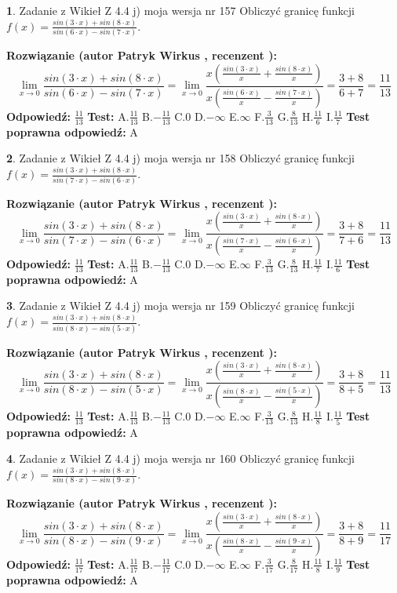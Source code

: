\documentclass[12pt, a4paper]{article}
\theoremstyle{definition} %
\newtheorem{zad}{}
\newcommand{\zadStart}[1]{\begin{zad}#1\newline}
\newcommand{\zadStop}{\end{zad}}
\newcommand{\rozwStart}[2]{\noindent \textbf{Rozwiązanie (autor #1 , recenzent #2): }\newline}
\newcommand{\rozwStop}{\newline}
\newcommand{\odpStart}{\noindent \textbf{Odpowiedź:}\newline}
\newcommand{\odpStop}{\newline}
\newcommand{\testStart}{\noindent \textbf{Test:}\newline}
\newcommand{\testStop}{\newline}
\newcommand{\kluczStart}{\noindent \textbf{Test poprawna odpowiedź:}\newline}
\newcommand{\kluczStop}{\newline}
\begin{document}
\zadStart{Zadanie z Wikieł Z 4.4 j) moja wersja nr 157}
Obliczyć granicę funkcji $f(x)=\frac{sin(3\cdot x) +sin(8\cdot x)}{sin(6\cdot x) -sin(7\cdot x)}$.
\zadStop
\rozwStart{Patryk Wirkus}{}
$$\lim\limits_{x\to 0}\frac{sin(3\cdot x) +sin(8\cdot x)}{sin(6\cdot x) -sin(7\cdot x)}=\lim\limits_{x\to 0}\frac{x(\frac{sin(3\cdot x)}{x}+\frac{sin(8\cdot x)}{x})}{x(\frac{sin(6\cdot x)}{x}-\frac{sin(7\cdot x)}{x})}=\frac{3+8}{6+7} = \frac{11}{13}$$
\rozwStop
\odpStart
$\frac{11}{13}$
\odpStop
\testStart
A.$\frac{11}{13}$
B.$-\frac{11}{13}$
C.$0$
D.$-\infty$
E.$\infty$
F.$\frac{3}{13}$
G.$\frac{8}{13}$
H.$\frac{11}{6}$
I.$\frac{11}{7}$
\testStop
\kluczStart
A
\kluczStop



\zadStart{Zadanie z Wikieł Z 4.4 j) moja wersja nr 158}
Obliczyć granicę funkcji $f(x)=\frac{sin(3\cdot x) +sin(8\cdot x)}{sin(7\cdot x) -sin(6\cdot x)}$.
\zadStop
\rozwStart{Patryk Wirkus}{}
$$\lim\limits_{x\to 0}\frac{sin(3\cdot x) +sin(8\cdot x)}{sin(7\cdot x) -sin(6\cdot x)}=\lim\limits_{x\to 0}\frac{x(\frac{sin(3\cdot x)}{x}+\frac{sin(8\cdot x)}{x})}{x(\frac{sin(7\cdot x)}{x}-\frac{sin(6\cdot x)}{x})}=\frac{3+8}{7+6} = \frac{11}{13}$$
\rozwStop
\odpStart
$\frac{11}{13}$
\odpStop
\testStart
A.$\frac{11}{13}$
B.$-\frac{11}{13}$
C.$0$
D.$-\infty$
E.$\infty$
F.$\frac{3}{13}$
G.$\frac{8}{13}$
H.$\frac{11}{7}$
I.$\frac{11}{6}$
\testStop
\kluczStart
A
\kluczStop



\zadStart{Zadanie z Wikieł Z 4.4 j) moja wersja nr 159}
Obliczyć granicę funkcji $f(x)=\frac{sin(3\cdot x) +sin(8\cdot x)}{sin(8\cdot x) -sin(5\cdot x)}$.
\zadStop
\rozwStart{Patryk Wirkus}{}
$$\lim\limits_{x\to 0}\frac{sin(3\cdot x) +sin(8\cdot x)}{sin(8\cdot x) -sin(5\cdot x)}=\lim\limits_{x\to 0}\frac{x(\frac{sin(3\cdot x)}{x}+\frac{sin(8\cdot x)}{x})}{x(\frac{sin(8\cdot x)}{x}-\frac{sin(5\cdot x)}{x})}=\frac{3+8}{8+5} = \frac{11}{13}$$
\rozwStop
\odpStart
$\frac{11}{13}$
\odpStop
\testStart
A.$\frac{11}{13}$
B.$-\frac{11}{13}$
C.$0$
D.$-\infty$
E.$\infty$
F.$\frac{3}{13}$
G.$\frac{8}{13}$
H.$\frac{11}{8}$
I.$\frac{11}{5}$
\testStop
\kluczStart
A
\kluczStop



\zadStart{Zadanie z Wikieł Z 4.4 j) moja wersja nr 160}
Obliczyć granicę funkcji $f(x)=\frac{sin(3\cdot x) +sin(8\cdot x)}{sin(8\cdot x) -sin(9\cdot x)}$.
\zadStop
\rozwStart{Patryk Wirkus}{}
$$\lim\limits_{x\to 0}\frac{sin(3\cdot x) +sin(8\cdot x)}{sin(8\cdot x) -sin(9\cdot x)}=\lim\limits_{x\to 0}\frac{x(\frac{sin(3\cdot x)}{x}+\frac{sin(8\cdot x)}{x})}{x(\frac{sin(8\cdot x)}{x}-\frac{sin(9\cdot x)}{x})}=\frac{3+8}{8+9} = \frac{11}{17}$$
\rozwStop
\odpStart
$\frac{11}{17}$
\odpStop
\testStart
A.$\frac{11}{17}$
B.$-\frac{11}{17}$
C.$0$
D.$-\infty$
E.$\infty$
F.$\frac{3}{17}$
G.$\frac{8}{17}$
H.$\frac{11}{8}$
I.$\frac{11}{9}$
\testStop
\kluczStart
A
\kluczStop
\end{document}
